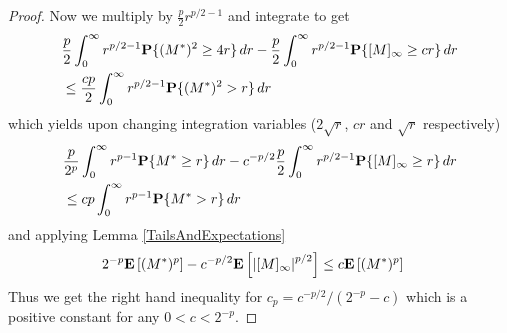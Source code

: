 \begin{proof}
Now we multiply by $\frac{p}{2}r^{p/2-1}$ and integrate to get 
\begin{align*}
&\frac{p}{2}\int_0^\infty r^{p/2-1}\textbf{P}\{(M^*)^2 \geq 4r\} \, dr - \frac{p}{2}\int_0^\infty r^{p/2-1}\textbf{P}\{[M]_\infty \geq cr\} \, dr \\
&\leq \frac{cp}{2}\int_0^\infty r^{p/2-1} \textbf{P}\{(M^*)^2 > r\} \, dr \\
\end{align*}
 which yields upon changing integration variables ($2 \sqrt{r}$, $cr$ and $\sqrt{r}$ respectively)
\begin{align*}
&\frac{p}{2^p}\int_0^\infty r^{p-1}\textbf{P}\{M^* \geq r\} \, dr - c^{-p/2} \frac{p}{2}\int_0^\infty r^{p/2-1}\textbf{P}\{[M]_\infty \geq r\} \, dr \\
&\leq cp\int_0^\infty r^{p-1} \textbf{P}\{M^* > r\} \, dr \\
\end{align*}
and applying Lemma \ref{TailsAndExpectations}
\begin{align*}
2^{-p} \textbf{E}\left[(M^*)^{p}\right] - c^{-p/2} \textbf{E}\left[\left \vert [M]_\infty \right \vert^{p/2}\right] &\leq c \textbf{E}\left[(M^*)^{p}\right]
\end{align*}
Thus we get the right hand inequality for $c_p = c^{-p/2}/(2^{-p} -c)$ which is a positive constant for any $0 < c < 2^{-p}$.


\end{proof}
